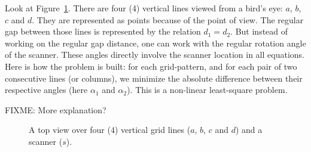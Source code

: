 Look at Figure~\ref{fig:topview}. There are four (4) vertical lines viewed from a bird's eye: $a$, $b$, $c$ and $d$. They are represented as points because of the point of view. The regular gap between those lines is represented by the relation $d_1 = d_2$. But instead of working on the regular gap distance, one can work with the regular rotation angle of the scanner. These angles directly involve the scanner location in all equations. Here is how the problem is built: for each grid-pattern, and for
each pair of two consecutive lines (or columns), we minimize the absolute difference between their respective angles (here $\alpha_1$ and $\alpha_2$). This is a non-linear least-square problem.

FIXME: More explanation?

\begin{figure}
  \centering
  \caption{A top view over four (4) vertical grid lines ($a$, $b$, $c$ and $d$) and a scanner ($s$).}
  \label{fig:topview}
\end{figure}

